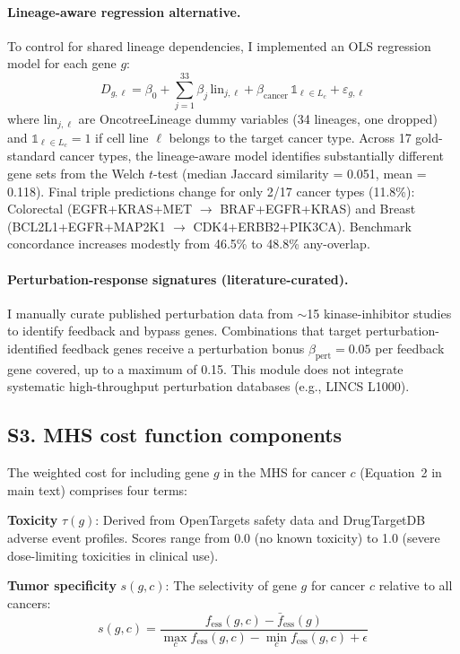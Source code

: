\documentclass[11pt]{article}
\begin{document}
\paragraph{Lineage-aware regression alternative.} To control for shared lineage dependencies, I implemented an OLS regression model for each gene $g$:
\[
D_{g,\ell} = \beta_0 + \sum_{j=1}^{33} \beta_j \, \text{lin}_{j,\ell} + \beta_{\text{cancer}} \, \mathbb{1}_{\ell \in L_c} + \varepsilon_{g,\ell}
\]
where $\text{lin}_{j,\ell}$ are OncotreeLineage dummy variables (34 lineages, one dropped) and $\mathbb{1}_{\ell \in L_c} = 1$ if cell line $\ell$ belongs to the target cancer type. Across 17 gold-standard cancer types, the lineage-aware model identifies substantially different gene sets from the Welch $t$-test (median Jaccard similarity = 0.051, mean = 0.118). Final triple predictions change for only 2/17 cancer types (11.8\%): Colorectal (EGFR+KRAS+MET $\to$ BRAF+EGFR+KRAS) and Breast (BCL2L1+EGFR+MAP2K1 $\to$ CDK4+ERBB2+PIK3CA). Benchmark concordance increases modestly from 46.5\% to 48.8\% any-overlap.

\paragraph{Perturbation-response signatures (literature-curated).} I manually curate published perturbation data from $\sim$15 kinase-inhibitor studies to identify feedback and bypass genes. Combinations that target perturbation-identified feedback genes receive a perturbation bonus $\beta_{\text{pert}} = 0.05$ per feedback gene covered, up to a maximum of 0.15. This module does not integrate systematic high-throughput perturbation databases (e.g., LINCS L1000).

\subsection{S3. MHS cost function components}

The weighted cost for including gene $g$ in the MHS for cancer $c$ (Equation~2 in main text) comprises four terms:

\textbf{Toxicity} $\tau(g)$: Derived from OpenTargets safety data and DrugTargetDB adverse event profiles. Scores range from 0.0 (no known toxicity) to 1.0 (severe dose-limiting toxicities in clinical use).

\textbf{Tumor specificity} $s(g,c)$: The selectivity of gene $g$ for cancer $c$ relative to all cancers:
\[
s(g,c) = \frac{f_{\text{ess}}(g,c) - \bar{f}_{\text{ess}}(g)}{\max_c f_{\text{ess}}(g,c) - \min_c f_{\text{ess}}(g,c) + \epsilon}
\]
\end{document}
